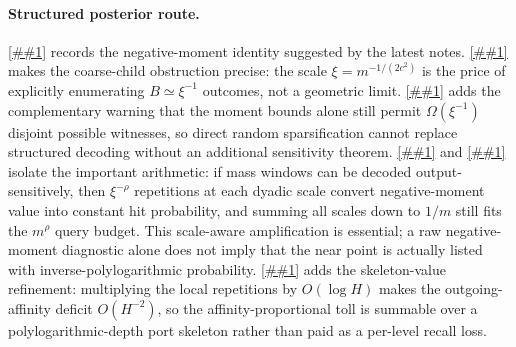 \documentclass[10pt]{article}
\newcommand{\cref}[1]{\ref{##1}}
\newcommand{\Cref}[1]{\ref{##1}}
\theoremstyle{definition}
\begin{document}
\paragraph{Structured posterior route.}
\Cref{lem:posterior-superlevel-compiler} records the negative-moment identity suggested by the latest notes. \Cref{lem:explicit-enumeration-barrier} makes the coarse-child obstruction precise: the scale $\xi=m^{-1/(2c^2)}$ is the price of explicitly enumerating $B\simeq\xi^{-1}$ outcomes, not a geometric limit. \Cref{lem:oblivious-sparsification-barrier} adds the complementary warning that the moment bounds alone still permit $\Omega(\xi^{-1})$ disjoint possible witnesses, so direct random sparsification cannot replace structured decoding without an additional sensitivity theorem. \Cref{lem:scale-window-compiler} and \cref{lem:dyadic-structured-amplification} isolate the important arithmetic: if mass windows can be decoded output-sensitively, then $\xi^{-\rho}$ repetitions at each dyadic scale convert negative-moment value into constant hit probability, and summing all scales down to $1/m$ still fits the $m^\rho$ query budget. This scale-aware amplification is essential; a raw negative-moment diagnostic alone does not imply that the near point is actually listed with inverse-polylogarithmic probability. \Cref{cor:dyadic-affinity-boost} adds the skeleton-value refinement: multiplying the local repetitions by \(O(\log H)\) makes the outgoing-affinity deficit \(O(H^{-2})\), so the affinity-proportional toll is summable over a polylogarithmic-depth port skeleton rather than paid as a per-level recall loss.
\end{document}
